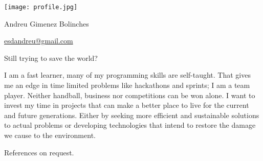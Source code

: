 \documentclass[]{infinity-cv}
\begin{document}
\begingroup
\hypersetup{ hidelinks, pdfnewwindow}
\begin{minipage}{0.15\textwidth} %
    \texttt{[image: profile.jpg]}
\end{minipage}
\hfill
\begin{minipage}{0.6\textwidth}
    \centering
    {\Huge\color{heading}Andreu Gimenez Bolinches}
    
    \medskip
    
    \href{mailto:esdandreu@gmail.com}{
        \faEnvelope\hspace{1pt} esdandreu@gmail.com
    } \hfill
    \href{https://www.linkedin.com/in/andreu-gimenez-bolinches-esdandreu/}{
        \faLinkedin
    } \hfill
    \href{https://esdandreu.github.io/}{\faGlobe} \hfill
    \href{https://stackoverflow.com/users/13180090/andreu-gimenez}{
        \faStackOverflow
    } \hfill
    \href{https://github.com/esdandreu}{\faGithub} \hfill
    \href{https://gitlab.com/esdandreu}{\faGitlab} \hfill
    
    \medskip \medskip
    Still trying to save the world?
\end{minipage}
\hfill
\begin{minipage}{0.15\textwidth}
\end{minipage}
\medskip
\endgroup

\medskip
I am a fast learner, many of my programming skills are self-taught. That gives
me an edge in time limited problems like hackathons and sprints; I am a team
player. Neither handball, business nor competitions can be won alone. I want to
invest my time in projects that can make a better place to live for the current
and future generations. Either by seeking more efficient and sustainable
solutions to actual problems or developing technologies that intend to restore
the damage we cause to the environment.



\medskip

\begin{minipage}{0.45\textwidth}
    
    
\end{minipage}
\hfill
\begin{minipage}{0.5\textwidth}
    
\end{minipage}

\vfill
\centering
References on request.
\end{document}
